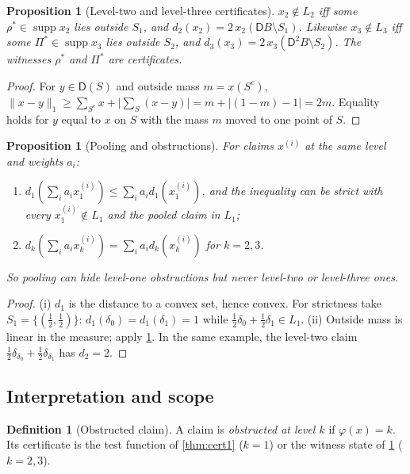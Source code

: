 \documentclass[11pt]{article}
\newtheorem{proposition}[theorem]{Proposition}
\theoremstyle{definition}
\newtheorem{definition}[theorem]{Definition}
\theoremstyle{remark}
\newcommand{\D}{\mathsf{D}}
\begin{document}
\begin{proposition}[Level-two and level-three certificates]\label{prop:cert23}
$x_2\notin L_2$ iff some $\rho^\ast\in\operatorname{supp}x_2$ lies outside $S_1$, and
$d_2(x_2)=2\,x_2(\D B\setminus S_1)$. Likewise $x_3\notin L_3$ iff some
$\Pi^\ast\in\operatorname{supp}x_3$ lies outside $S_2$, and $d_3(x_3)=2\,x_3(\D^2B\setminus S_2)$.
The witnesses $\rho^\ast$ and $\Pi^\ast$ are certificates.
\end{proposition}
\begin{proof}
For $y\in\D(S)$ and outside mass $m=x(S^c)$, $\lVert x-y\rVert_1\ge\sum_{S^c}x+\big|\sum_S(x-y)\big|=
m+|(1-m)-1|=2m$. Equality holds for $y$ equal to $x$ on $S$ with the mass $m$ moved to one point of $S$.
\end{proof}

\begin{proposition}[Pooling and obstructions]\label{prop:pool-obstr}
For claims $x^{(i)}$ at the same level and weights $a_i$:
\begin{enumerate}[label=(\roman*)]
\item $d_1(\sum_ia_ix_1^{(i)})\le\sum_ia_id_1(x_1^{(i)})$, and the inequality can be strict with
  every $x_1^{(i)}\notin L_1$ and the pooled claim in $L_1$;
\item $d_k(\sum_ia_ix_k^{(i)})=\sum_ia_id_k(x_k^{(i)})$ for $k=2,3$.
\end{enumerate}
So pooling can hide level-one obstructions but never level-two or level-three ones.
\end{proposition}
\begin{proof}
(i) $d_1$ is the distance to a convex set, hence convex. For strictness take $S_1=\{(\tfrac12,\tfrac12)\}$:
$d_1(\delta_0)=d_1(\delta_1)=1$ while $\tfrac12\delta_0+\tfrac12\delta_1\in L_1$. (ii) Outside mass is
linear in the measure; apply \cref{prop:cert23}. In the same example, the level-two claim
$\tfrac12\delta_{\delta_0}+\tfrac12\delta_{\delta_1}$ has $d_2=2$.
\end{proof}

\subsection{Interpretation and scope}

\begin{definition}[Obstructed claim]
A claim is \emph{obstructed at level $k$} if $\varphi(x)=k$. Its certificate is the test function of
\cref{thm:cert1} ($k=1$) or the witness state of \cref{prop:cert23} ($k=2,3$).
\end{definition}
\end{document}
